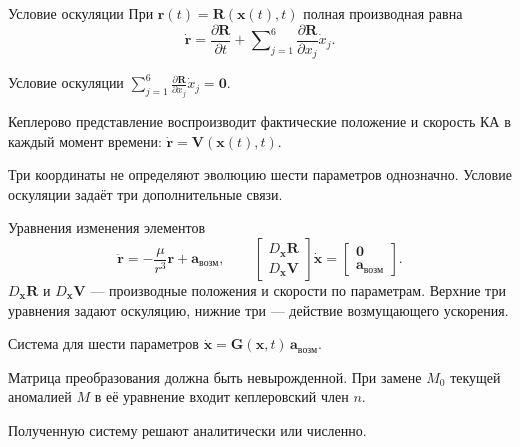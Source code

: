\documentclass[11pt,aspectratio=169,t]{beamer}
\begin{document}
\begin{frame}{Условие оскуляции}
\setlength{\abovedisplayskip}{4pt}\setlength{\belowdisplayskip}{4pt}
При $\mathbf r(t)=\mathbf R(\mathbf x(t),t)$ полная производная равна
\[
\dot{\mathbf r}=\frac{\partial\mathbf R}{\partial t}
+\sum\nolimits_{j=1}^{6}\frac{\partial\mathbf R}{\partial x_j}\dot x_j.
\]
\begin{block}{Условие оскуляции}
\centering
$\displaystyle\sum\nolimits_{j=1}^{6}\frac{\partial\mathbf R}{\partial x_j}\dot x_j=\mathbf0.$
\par\smallskip\justifying
Кеплерово представление воспроизводит фактические положение и скорость КА в каждый момент времени: $\dot{\mathbf r}=\mathbf V(\mathbf x(t),t)$.
\end{block}
\justifying
Три координаты не определяют эволюцию шести параметров однозначно. Условие оскуляции задаёт три дополнительные связи.
\end{frame}

\begin{frame}{Уравнения изменения элементов}
\setlength{\abovedisplayskip}{4pt}\setlength{\belowdisplayskip}{4pt}
\[
\ddot{\mathbf r}=-\frac{\mu}{r^3}\mathbf r+\mathbf a_{\text{возм}},
\qquad
\begin{bmatrix}D_{\mathbf x}\mathbf R\\D_{\mathbf x}\mathbf V\end{bmatrix}
\dot{\mathbf x}=\begin{bmatrix}\mathbf0\\\mathbf a_{\text{возм}}\end{bmatrix}.
\]
\justifying
$D_{\mathbf x}\mathbf R$ и $D_{\mathbf x}\mathbf V$ --- производные положения и скорости по параметрам. Верхние три уравнения задают оскуляцию, нижние три --- действие возмущающего ускорения.
\begin{block}{Система для шести параметров}
\centering
$\dot{\mathbf x}=\mathbf G(\mathbf x,t)\,\mathbf a_{\text{возм}}.$
\par\smallskip\justifying
Матрица преобразования должна быть невырожденной. При замене $M_0$ текущей аномалией $M$ в её уравнение входит кеплеровский член $n$.
\end{block}
\justifying
Полученную систему решают аналитически или численно.
\end{frame}
\end{document}
